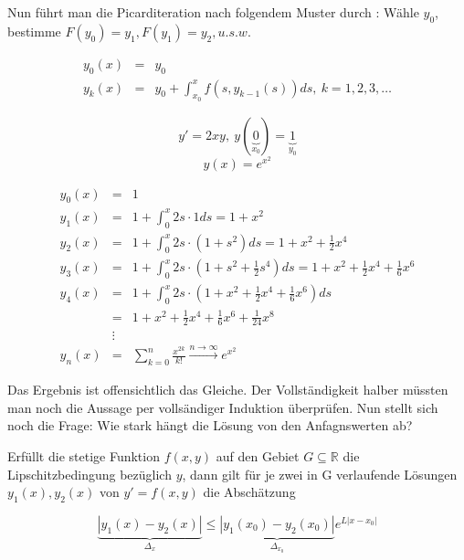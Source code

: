 \documentclass[10pt,a4paper]{article}
\begin{document}
Nun führt man die Picarditeration nach folgendem Muster durch
:
Wähle $y_0$, bestimme $F(y_0)=y_1, F(y_1)=y_2, u.s.w.$

\begin{eqnarray*}
y_0(x)&=&y_0 \\ 
y_k(x)&=&y_0 + \int^{x}_{x_0}f(s,y_{k-1}(s))ds , ~ k=1,2,3,\ldots
\end{eqnarray*}


\begin{bsp}[$y'=2xy$ Lösung über Separation der Variablen]
$$y'=2xy, ~ y(\underbrace{0}_{x_0})=\underbrace{1}_{y_0}$$  
$$y(x)=e^{x^{2}}$$
\end{bsp}

\begin{bsp}[$y'=2xy$, Lösung über Picarditeration]

\begin{eqnarray*}
y_0(x)&=&1 \\
y_1(x)&=&1 + \int^{x}_{0} 2s \cdot 1 ds = 1+x^{2} \\
y_2(x)&=&1 + \int^{x}_{0} 2s \cdot \left(1+s^{2}\right) ds = 1+x^{2}+\frac{1}{2}x^{4} \\
y_3(x)&=&1 + \int^{x}_{0} 2s \cdot \left(1+s^{2}+\frac{1}{2}s^{4}\right) ds = 1+x^{2}+\frac{1}{2}x^{4} + \frac{1}{6}x^{6} \\
y_4(x)&=&1 + \int^{x}_{0} 2s \cdot \left(1+x^{2}+\frac{1}{2}x^{4} + \frac{1}{6}x^{6}\right) ds\\
&=& 1+ x^{2} + \frac{1}{2}x^{4} + \frac{1}{6}x^{6}+\frac{1}{24}x^{8}\\
 & \vdots & \\
y_n(x)&=&\sum^{n}_{k=0} \frac{x^{2k}}{k!} \xrightarrow{n \rightarrow \infty} e^{x^{2}}
\end{eqnarray*}

\end{bsp}

\noindent Das Ergebnis ist offensichtlich das Gleiche. Der Vollständigkeit halber müssten man noch die Aussage per vollsändiger Induktion überprüfen. Nun stellt sich noch die Frage: Wie stark hängt die Lösung von den Anfagnswerten ab?

\begin{satz}
Erfüllt die stetige Funktion $f(x,y)$ auf den Gebiet $G \subseteq \mathbb{R}$ die Lipschitzbedingung bezüglich $y$, dann gilt für je zwei in G verlaufende Lösungen $y_1(x), y_2(x)$ von $y'=f(x,y)$ die Abschätzung

\begin{equation*}
\underbrace{|y_1(x)-y_2(x)|}_{\Delta_x} \leq \underbrace{|y_1(x_0)-y_2(x_0)|}_{\Delta_{x_0}}e^{L|x-x_0|}
\end{equation*}
\end{satz}
\end{document}
